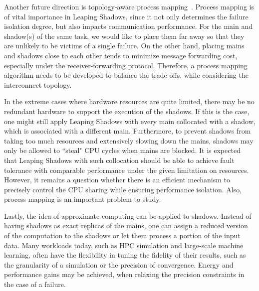 Another future direction is topology-aware process mapping~\cite{von2012topology}. Process mapping is of vital importance in Leaping Shadows, since it not only determines the failure isolation degree, but also impacts communication performance. For the main and shadow(s) of the same task, we would like to place them far away so that they are unlikely to be victims of a single failure. On the other hand, placing mains and shadows close to each other tends to minimize message forwarding cost, especially under the receiver-forwarding protocol. Therefore, a process mapping algorithm needs to be developed to balance the trade-offs, while considering the interconnect topology. 

In the extreme cases where hardware resources are quite limited, there may be no redundant hardware to support the execution of the shadows. If this is the case, one might still apply Leaping Shadows with every main collocated with a shadow, which is associated with a different main. Furthermore, to prevent shadows from taking too much resources and extensively slowing down the mains, shadows may only be allowed to ``steal" CPU cycles when mains are blocked. It is expected that Leaping Shadows with such collocation should be able to achieve fault tolerance with comparable performance under the given limitation on resources. However, it remains a question whether there is an efficient mechanism to precisely control the CPU sharing while ensuring performance isolation. Also, process mapping is an important problem to study.

Lastly, the idea of approximate computing can be applied to shadows. Instead of having shadows as exact replicas of the mains, one can assign a reduced version of the computation to the shadows or let them process a portion of the input data. Many workloads today, such as HPC simulation and large-scale machine learning, often have the flexibility in tuning the fidelity of their results, such as the granularity of a simulation or the precision of convergence.
Energy and performance gains may be achieved, when relaxing the precision constraints in the case of a failure.












